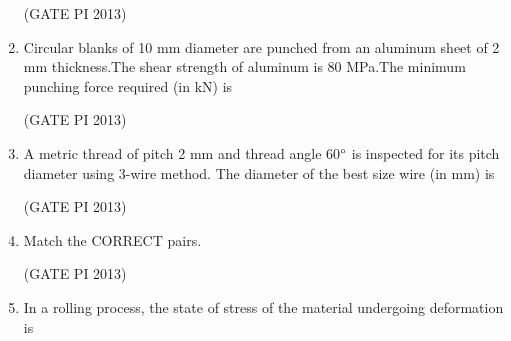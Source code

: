 \documentclass[journal,12pt,onecolumn]{IEEEtran}
\theoremstyle{remark}
\begin{document}
\begin{enumerate}
\hfill (GATE PI 2013)

\item Circular blanks of 10 mm diameter are punched from an aluminum sheet of 2 mm thickness.The 
shear strength of aluminum is 80 MPa.The minimum punching force required (in kN) is

\begin{enumerate}
\end{enumerate}

\hfill (GATE PI 2013)

\item A metric thread of pitch 2 mm and thread angle 60$\degree $ is inspected for its pitch diameter using 3-wire 
method. The diameter of the best size wire (in mm) is 

\begin{enumerate}
\end{enumerate}

\hfill (GATE PI 2013)

\item Match the CORRECT pairs. \\


\begin{enumerate}
\end{enumerate}

\hfill (GATE PI 2013)

\item In a rolling process, the state of stress of the material undergoing deformation is 
\begin{enumerate}
\end{enumerate}


\end{enumerate}
\end{document}
